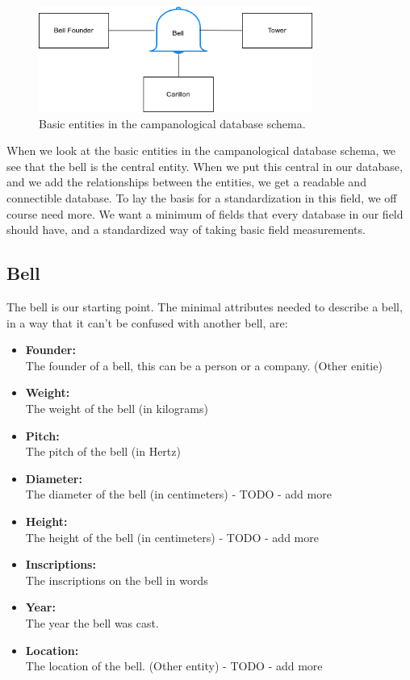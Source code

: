 \documentclass[11pt, a4paper]{article}
\begin{document}
\begin{figure}[h!]
    \centering
    \includegraphics[width=0.8\textwidth]{images/basic_entities.png}
    \caption{Basic entities in the campanological database schema.}
    \label{fig:basic-entities}
\end{figure}

When we look at the basic entities in the campanological database schema, we see that the bell is the central entity.
When we put this central in our database, and we add the relationships between the entities, we get a readable and 
connectible database. To lay the basis for a standardization in this field, we off course need more. We want a minimum
of fields that every database in our field should have, and a standardized way of taking basic field measurements.

\subsection{Bell}

The bell is our starting point. The minimal attributes needed to describe a bell, in a way that it can't be confused with another bell, are:

\begin{itemize}
    \item \textbf{Founder:} \\
        The founder of a bell, this can be a person or a company. (Other enitie)
    \item \textbf{Weight:} \\
        The weight of the bell (in kilograms)
    \item \textbf{Pitch:} \\
        The pitch of the bell (in Hertz)
    \item \textbf{Diameter:} \\
        The diameter of the bell (in centimeters) - TODO - add more
    \item \textbf{Height:} \\
        The height of the bell (in centimeters) - TODO - add more
    \item \textbf{Inscriptions:} \\
        The inscriptions on the bell in words
    \item \textbf{Year:} \\
        The year the bell was cast.
    \item \textbf{Location:} \\
        The location of the bell. (Other entity) - TODO - add more
\end{itemize}
\end{document}
